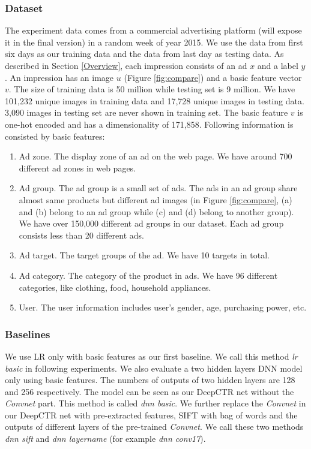 \documentclass{sig-alternate}
\begin{document}
\subsubsection{Dataset}
The experiment data comes from a commercial advertising platform (will expose it in the final version) in a  random week of year 2015. We use the data from first six days as our training data and the data from last day as testing data.  As described in Section \ref{Overview}, each impression consists of an ad $x$ and a label $y$.  An impression has an image $u$ (Figure \ref{fig:compare}) and a basic feature vector $v$.  The size of training data is 50 million while testing set is 9 million. We have 101,232 unique images in training data and 17,728 unique images in testing data. 3,090 images in testing set are never shown in training set. The basic feature $v$ is one-hot encoded and has a dimensionality of 171,858. Following information is consisted by basic features:
\begin{enumerate}
	\item Ad zone. The display zone of an ad on the web page. We have around 700 different ad zones in web pages.
	\item Ad group. The ad group is a small set of ads. The ads in an ad group share almost same  products but different ad images (in Figure \ref{fig:compare}, (a) and (b) belong to an ad group while (c) and (d) belong to another group). We have over 150,000 different ad groups in our dataset. Each ad group consists less than 20 different   ads.
	\item Ad target. The target groups of the ad.  We have 10 targets in total.
	\item Ad category. The category of the product in ads. We have 96 different categories, like clothing, food, household appliances. 
	\item User. The user information includes user's gender, age, purchasing power, etc. 
\end{enumerate}
\subsubsection{Baselines}
We use LR only with basic features as our first baseline. We call this method \emph{lr basic} in following experiments.  We also evaluate a two hidden layers DNN model only using basic features. The numbers of outputs of two hidden layers  are 128 and 256 respectively. The model can be seen as our DeepCTR net without the \emph{Convnet} part. This method is called \emph{dnn basic}. We further replace the \emph{Convnet} in our DeepCTR net with pre-extracted features, SIFT \cite{lowe1999object} with bag of words and the outputs of different layers of the pre-trained  \emph{Convnet}. We call these two methods \emph{dnn sift} and \emph{dnn layername} (for example \emph{dnn conv17}). 
\end{document}
